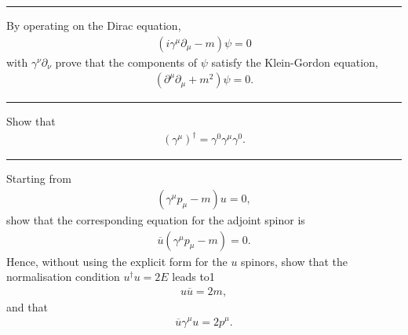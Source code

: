 \noindent\rule{7in}{1.5pt}


\begin{problem}{4.7}
By operating on the Dirac equation,
\begin{align*}
    \left( i\gamma^\mu \partial_\mu - m \right) \psi = 0
\end{align*}
with $\gamma^\nu\partial_\nu$ prove that the components of $\psi$ satisfy the Klein-Gordon equation,
\begin{align*}
    \left( \partial^\mu \partial_\mu +m^2 \right) \psi = 0.
\end{align*}
\end{problem}
\begin{solution}

\end{solution}

\noindent\rule{7in}{1.5pt}


\begin{problem}{4.8}
Show that
\begin{align*}
    \left(\gamma^\mu\right)^\dagger = \gamma^0 \gamma^\mu \gamma^0.
\end{align*}
\end{problem}
\begin{solution}

\end{solution}

\noindent\rule{7in}{1.5pt}


\begin{problem}{4.9}
Starting from
\begin{align*}
    \left( \gamma^\mu p_\mu - m  \right) u = 0,
\end{align*}
show that the corresponding equation for the adjoint spinor is
\begin{align*}
    \overbar{u} \left( \gamma^\mu p_\mu -m \right)=0.
\end{align*} 
Hence, without using the explicit form for the $u$ spinors, show that the normalisation condition $u^\dagger u = 2E$ leads to1
\begin{align*}
    u\overbar{u} = 2m,
\end{align*}
and that
\begin{align*}
   \overbar{u} \gamma^\mu u = 2p^\mu.
\end{align*}
\end{problem}
\begin{solution}

\end{solution}

